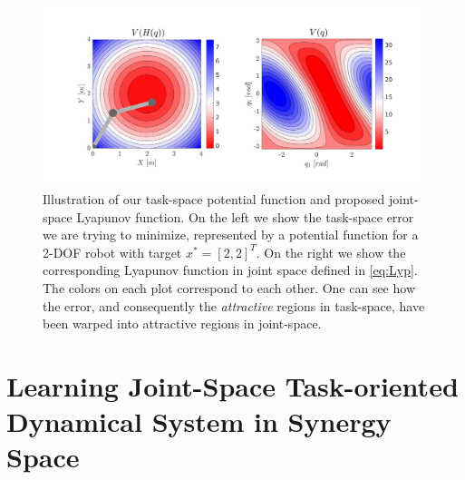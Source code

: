 \documentclass[letterpaper, 10 pt, conference,fleqn]{ieeeconf}
\begin{document}

\begin{figure}[t]
	\centering
	\includegraphics[width=\linewidth,trim={2.5cm 1.75cm 2.5cm 2cm},clip]{../Pic/Sources/Schematic_final.pdf}
	\caption{Illustration of our task-space potential function and proposed joint-space Lyapunov function. On the left we show the task-space error we are trying to minimize, represented by a potential function for a 2-DOF robot with target $x^*=[2,2]^T$. On the right we show the corresponding Lyapunov function in joint space defined in \eqref{eq:Lyp}. The colors on each plot correspond to each other. One can see how the error, and consequently the \textit{attractive} regions in task-space, have been warped into attractive regions in joint-space.}
	\label{fig:error_schematic}
	\vspace{-15pt}
\end{figure}


\section{Learning \textbf{J}oint-Space \textbf{T}ask-oriented \textbf{D}ynamical \textbf{S}ystem in Synergy Space} 
\label{Sec:Learning}
\end{document}
